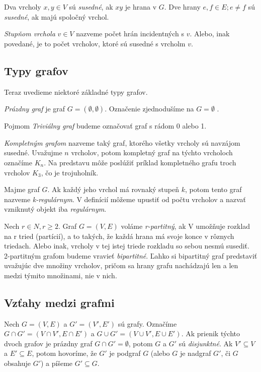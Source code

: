Dva vrcholy $x, y \in V$ sú  \textit{susedné}, ak $xy$ je hrana v $G$.
Dve hrany $e, f \in E; e \neq f$ sú  \textit{susedné}, ak majú spoločný vrchol.\newline

\textit{Stupňom vrchola} $v \in V$ nazveme počet hrán incidentných s $v$. Alebo, inak povedané, je to počet vrcholov, ktoré sú susedné s vrcholm $v$.


\subsection{Typy grafov}

Teraz uvedieme niektoré základné typy grafov.\newline

\textit{Prázdny graf} je graf $G = (\emptyset, \emptyset)$. Označenie zjednodušíme na $G = \emptyset$ .\newline

Pojmom \textit{Triviálny graf} budeme označovať graf s rádom 0 alebo 1.\newline

\textit{Kompletným grafom} nazveme taký graf, ktorého všetky vrcholy sú navzájom susedné. Uvažujme $n$ vrcholov, potom kompletný graf na týchto vrcholoch označíme $K_{n}$. Na predstavu môže poslúžiť príklad kompletného grafu troch vrcholov $K_{3}$, čo je trojuholník.\newline

Majme graf $G$. Ak každý jeho vrchol má rovnaký stupeň $k$, potom tento graf nazveme \textit{k-regulárnym}. V definícií môžeme upustiť od počtu vrcholov a nazvať vzniknutý objekt iba \textit{regulárnym}.\newline

Nech $r\in N, r\geq 2$. Graf $G = (V, E)$ voláme \textit{r-partitný}, ak V umožňuje rozklad na r tried (partícií), a to takých, že každá hrana má svoje konce v rôznych triedach. Alebo inak, vrcholy v tej istej triede rozkladu so sebou nesmú susediť. 2-partitným grafom budeme vravieť \textit{bipartitné}. Ľahko si bipartitný graf predstaviť uvažujúc dve množiny vrcholov, pričom sa hrany grafu nachádzajú len a len medzi týmito množinami, nie v nich.


\subsection{Vzťahy medzi grafmi}

Nech $G = (V, E)$ a $G' = (V', E')$ sú grafy. Označíme $G\cap G' = (V\cap V', E\cap E')$ a $G\cup G' = (V\cup V', E\cup E')$. Ak prienik týchto dvoch grafov je prázdny graf $G\cap G' = \emptyset$, potom $G$ a $G'$ sú \textit{disjunktné}. Ak $V'\subseteq V$ a $E'\subseteq E$, potom hovoríme, že $G'$ je podgraf $G$ (alebo $G$ je nadgraf $G'$, či $G$ obsahuje $G'$) a píšeme $G'\subseteq G$.\newline


